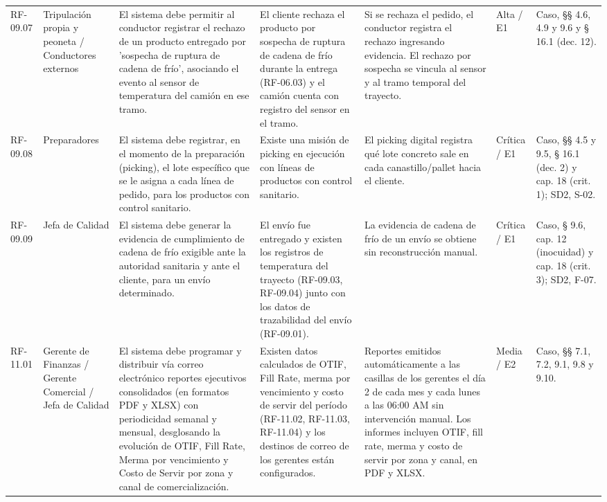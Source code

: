 {\begin{longtable}{@{}F{0.062} F{0.080} F{0.195} F{0.160} F{0.240} F{0.093} F{0.170}@{}}
  RF-09.07 & Tripulación propia y peoneta / Conductores externos & El sistema debe permitir al conductor registrar el rechazo de un producto entregado por 'sospecha de ruptura de cadena de frío', asociando el evento al sensor de temperatura del camión en ese tramo. & El cliente rechaza el producto por sospecha de ruptura de cadena de frío durante la entrega (RF-06.03) y el camión cuenta con registro del sensor en el tramo. & Si se rechaza el pedido, el conductor registra el rechazo ingresando evidencia. El rechazo por sospecha se vincula al sensor y al tramo temporal del trayecto. & Alta / E1 & Caso, §§ 4.6, 4.9 y 9.6 y § 16.1 (dec. 12). \\
  RF-09.08 & Preparadores & El sistema debe registrar, en el momento de la preparación (picking), el lote específico que se le asigna a cada línea de pedido, para los productos con control sanitario. & Existe una misión de picking en ejecución con líneas de productos con control sanitario. & El picking digital registra qué lote concreto sale en cada canastillo/pallet hacia el cliente. & Crítica / E1 & Caso, §§ 4.5 y 9.5, § 16.1 (dec. 2) y cap. 18 (crit. 1); SD2, S-02. \\
  RF-09.09 & Jefa de Calidad & El sistema debe generar la evidencia de cumplimiento de cadena de frío exigible ante la autoridad sanitaria y ante el cliente, para un envío determinado. & El envío fue entregado y existen los registros de temperatura del trayecto (RF-09.03, RF-09.04) junto con los datos de trazabilidad del envío (RF-09.01). & La evidencia de cadena de frío de un envío se obtiene sin reconstrucción manual. & Crítica / E1 & Caso, § 9.6, cap. 12 (inocuidad) y cap. 18 (crit. 3); SD2, F-07. \\
  RF-11.01 & Gerente de Finanzas / Gerente Comercial / Jefa de Calidad & El sistema debe programar y distribuir vía correo electrónico reportes ejecutivos consolidados (en formatos PDF y XLSX) con periodicidad semanal y mensual, desglosando la evolución de OTIF, Fill Rate, Merma por vencimiento y Costo de Servir por zona y canal de comercialización. & Existen datos calculados de OTIF, Fill Rate, merma por vencimiento y costo de servir del período (RF-11.02, RF-11.03, RF-11.04) y los destinos de correo de los gerentes están configurados. & Reportes emitidos automáticamente a las casillas de los gerentes el día 2 de cada mes y cada lunes a las 06:00 AM sin intervención manual. Los informes incluyen OTIF, fill rate, merma y costo de servir por zona y canal, en PDF y XLSX. & Media / E2 & Caso, §§ 7.1, 7.2, 9.1, 9.8 y 9.10. \\

\end{longtable}}
